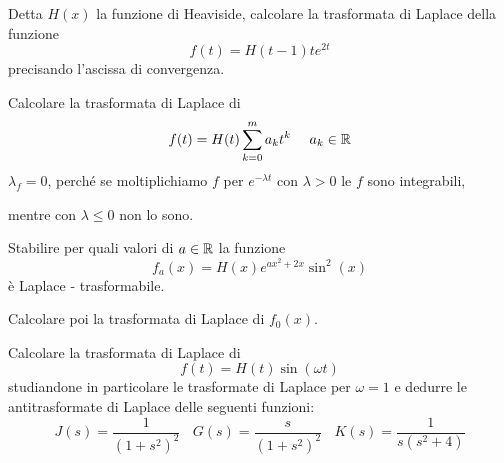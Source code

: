 Detta $\displaystyle H(x)$ la funzione di Heaviside, calcolare la trasformata di Laplace della funzione
\begin{equation*}
f(t) = H(t - 1) te^{2t}
\end{equation*}
precisando l'ascissa di convergenza.
\Esercizio{}

Calcolare la trasformata di Laplace di
\begin{equation*}
f(t) = H(t)\sum ^{m}_{k = 0} a_{k} t^{k} \ \ \ \ a_{k} \in \RR 
\end{equation*}
$\displaystyle \lambda _{f} = 0$, perché se moltiplichiamo $\displaystyle f$ per $\displaystyle e^{ - \lambda t}$ con $\displaystyle \lambda  > 0$ le $\displaystyle f$ sono integrabili, 

mentre con $\displaystyle \lambda \leqslant 0$ non lo sono.
\Esercizio{}

Stabilire per quali valori di $\displaystyle a\in \mathbb{R} $ la funzione
\begin{equation*}
f_{a}(x) = H(x) e^{ax^{2} + 2x}\sin^{2}(x)
\end{equation*}
è Laplace - trasformabile.

Calcolare poi la trasformata di Laplace di $\displaystyle f_{0}(x)$.
\Esercizio{}

Calcolare la trasformata di Laplace di
\begin{equation*}
f(t) = H(t)\sin(\omega t)
\end{equation*}
studiandone in particolare le trasformate di Laplace per $\displaystyle \omega = 1$ e dedurre le antitrasformate di Laplace delle seguenti funzioni:
\begin{equation*}
J(s) = \frac{1}{\left(1 + s^{2}\right)^{2}} \ \ \ \ G(s) = \frac{s}{\left(1 + s^{2}\right)^{2}} \ \ \ \ K(s) = \frac{1}{s\left(s^{2} + 4\right)}
\end{equation*}
\ParteSoluzioni
\Soluzione

